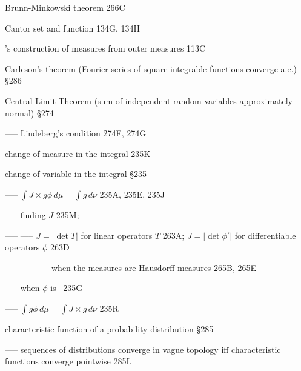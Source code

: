 Brunn-Minkowski theorem 266C

\indexmedskip

Cantor set and function 134G, 134H




\indexheader{\Caratheodory}
\Caratheodory's construction of measures from outer measures 113C

















Carleson's theorem
(Fourier series of square-integrable functions converge a.e.) \S286








Central Limit Theorem
(sum of independent random variables approximately normal) \S274


----- Lindeberg's condition 274F, 274G

change of measure in the integral 235K

change of variable in the integral \S235

----- $\int J\times g\phi\,d\mu=\int g\,d\nu$ 235A, 235E, 235J

----- finding $J$ 235M; 

----- ----- $J=|\det T|$ for linear operators $T$ 263A;
$J=|\det\phi'|$ for differentiable operators $\phi$ 263D


----- ----- ----- when the measures are Hausdorff measures 265B, 265E


----- when $\phi$ is \imp\ 235G

----- $\int g\phi\,d\mu=\int J\times g\,d\nu$ 235R

characteristic function of a probability distribution \S285

----- sequences of distributions converge in vague topology iff
characteristic functions converge pointwise 285L















































